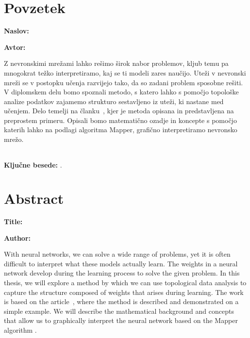 \clearemptydoublepage{}

\chapter*{Povzetek}

\noindent\textbf{Naslov:} \ttitle{}
\bigskip

\noindent\textbf{Avtor:} \tauthor{}
\bigskip

\noindent Z nevronskimi mrežami lahko rešimo širok nabor problemov, kljub temu pa mnogokrat težko interpretiramo, kaj se ti modeli zares naučijo. Uteži v nevronski mreži se v postopku učenja razvijejo tako, da so zadani problem sposobne rešiti. V diplomskem delu bomo spoznali metodo, s katero lahko s pomočjo topološke analize podatkov zajamemo strukturo sestavljeno iz uteži, ki nastane med učenjem. Delo temelji na članku~\cite{Gabella2021}, kjer je metoda opisana in predstavljena na preprostem primeru. Opisali bomo matematično ozadje in koncepte s pomočjo katerih lahko na podlagi algoritma Mapper, grafično interpretiramo nevronsko mrežo.  \\ \\


\bigskip

\noindent\textbf{Ključne besede:} \tkeywords.
\clearemptydoublepage{}

\chapter*{Abstract}

\noindent\textbf{Title:} \ttitleEn{}
\bigskip

\noindent\textbf{Author:} \tauthor{}
\bigskip

\noindent With neural networks, we can solve a wide range of problems, yet it is often difficult to interpret what these models actually learn. The weights in a neural network develop during the learning process to solve the given problem. In this thesis, we will explore a method by which we can use topological data analysis to capture the structure composed of weights that arises during learning. The work is based on the article~\cite{Gabella2021}, where the method is described and demonstrated on a simple example. We will describe the mathematical background and concepts that allow us to graphically interpret the neural network based on the Mapper algorithm .
\bigskip

